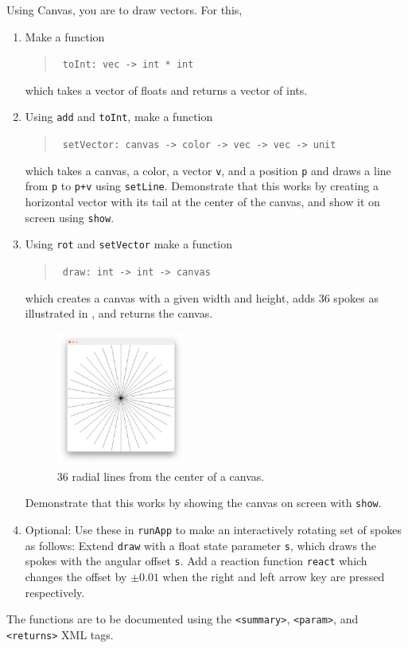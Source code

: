 Using Canvas, you are to draw vectors. For this,
\begin{enumerate}
\item Make a function
  \begin{quote}
    \mbox{\lstinline! toInt: vec -> int * int!}
  \end{quote}
  which takes a vector of floats and returns a vector of ints.
\item Using \lstinline{add} and \lstinline{toInt}, make a function
  \begin{quote}
    \mbox{\lstinline! setVector: canvas -> color -> vec -> vec -> unit!}
  \end{quote}
  which takes a canvas, a color, a vector \lstinline{v}, and a position \lstinline{p} and draws a line from \lstinline{p} to \lstinline{p+v} using \lstinline{setLine}. Demonstrate that this works by creating a horizontal vector with its tail at the center of the canvas, and show it on screen using \lstinline{show}.
\item Using \lstinline{rot} and \lstinline{setVector} make a function
  \begin{quote}
    \mbox{\lstinline! draw: int -> int -> canvas!}
  \end{quote}
  which creates a canvas with a given width and height, adds 36 spokes as illustrated in , and returns the canvas.
  \begin{figure}
    \centering
    \includegraphics[width=0.4\textwidth]{spokes}
    \caption{36 radial lines from the center of a canvas.}
    \label{fig:spokes}
  \end{figure}
  Demonstrate that this works by showing the canvas on screen with \lstinline{show}.
\item Optional: Use these in \lstinline{runApp} to make an interactively rotating set of spokes as follows: Extend \lstinline{draw} with a float state parameter \lstinline{s}, which draws the spokes with the angular offset \lstinline{s}. Add a reaction function \lstinline{react} which changes the offset by $\pm0.01$ when the right and left arrow key are pressed respectively.
\end{enumerate}
The functions are to be documented using the \verb|<summary>|, \verb|<param>|, and \verb|<returns>| XML tags.
